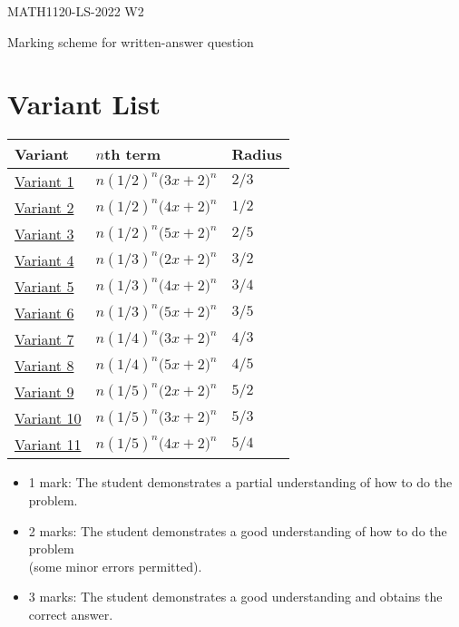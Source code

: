 \documentclass{article}
\begin{document}
\renewcommand{\arraystretch}{1.5}\setcounter{page}{0}
{\Large MATH1120-LS-2022 W2}

Marking scheme for written-answer question

\setcounter{section}{-1}

\section{Variant List}

\medskip
\begin{longtable}{|l|l|l|}
\hline
Variant & $n$th term & Radius\\ \hline
\hyperref[v1]{Variant 1} & $n\left(1/2\right)^n \big(3x + 2\big)^n$ & $2/3$\\ \hline
\hyperref[v2]{Variant 2} & $n\left(1/2\right)^n \big(4x + 2\big)^n$ & $1/2$\\ \hline
\hyperref[v3]{Variant 3} & $n\left(1/2\right)^n \big(5x + 2\big)^n$ & $2/5$\\ \hline
\hyperref[v4]{Variant 4} & $n\left(1/3\right)^n \big(2x + 2\big)^n$ & $3/2$\\ \hline
\hyperref[v5]{Variant 5} & $n\left(1/3\right)^n \big(4x + 2\big)^n$ & $3/4$\\ \hline
\hyperref[v6]{Variant 6} & $n\left(1/3\right)^n \big(5x + 2\big)^n$ & $3/5$\\ \hline
\hyperref[v7]{Variant 7} & $n\left(1/4\right)^n \big(3x + 2\big)^n$ & $4/3$\\ \hline
\hyperref[v8]{Variant 8} & $n\left(1/4\right)^n \big(5x + 2\big)^n$ & $4/5$\\ \hline
\hyperref[v9]{Variant 9} & $n\left(1/5\right)^n \big(2x + 2\big)^n$ & $5/2$\\ \hline
\hyperref[v10]{Variant 10} & $n\left(1/5\right)^n \big(3x + 2\big)^n$ & $5/3$\\ \hline
\hyperref[v11]{Variant 11} & $n\left(1/5\right)^n \big(4x + 2\big)^n$ & $5/4$\\ \hline
\end{longtable}

\medskip
{}
            \begin{small}
            \begin{itemize}
            \item 1 mark: The student demonstrates a partial understanding of how to do the problem.
            \item 2 marks: The student demonstrates a good understanding of how to do the problem \\ (some minor errors permitted).
            \item 3 marks: The student demonstrates a good understanding and obtains the correct answer.
            \end{itemize}
            \end{small}
\end{document}
